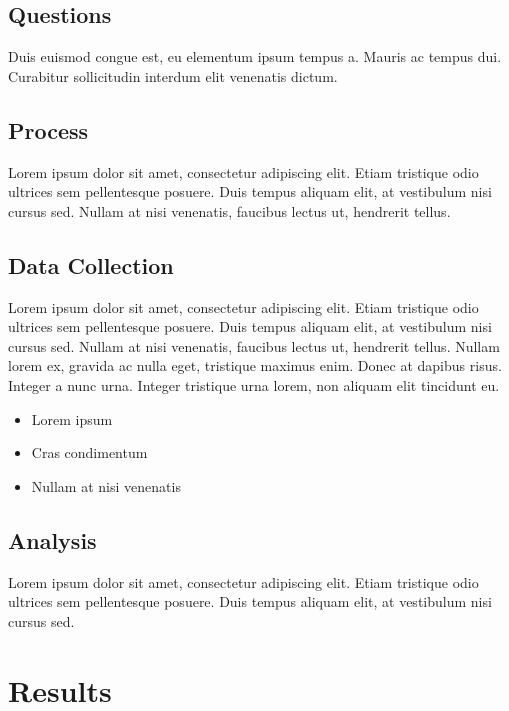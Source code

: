 \documentclass[11pt, a4paper]{resources/JTH}
\begin{document}
    \subsection{Questions}
    
        Duis euismod congue est, eu elementum ipsum tempus a. Mauris ac tempus dui. Curabitur sollicitudin interdum elit venenatis dictum. \parencite{beck2003test}

    \subsection{Process}
    
        Lorem ipsum dolor sit amet, consectetur adipiscing elit. Etiam tristique odio ultrices sem pellentesque posuere. Duis tempus aliquam elit, at vestibulum nisi cursus sed. Nullam at nisi venenatis, faucibus lectus ut, hendrerit tellus.

    \subsection{Data Collection}
    
        Lorem ipsum dolor sit amet, consectetur adipiscing elit. Etiam tristique odio ultrices sem pellentesque posuere. Duis tempus aliquam elit, at vestibulum nisi cursus sed. Nullam at nisi venenatis, faucibus lectus ut, hendrerit tellus. Nullam lorem ex, gravida ac nulla eget, tristique maximus enim. Donec at dapibus risus. Integer a nunc urna. Integer tristique urna lorem, non aliquam elit tincidunt eu.
        
        \begin{itemize}
            \item Lorem ipsum
            \item Cras condimentum
            \item Nullam at nisi venenatis
        \end{itemize}

    \subsection{Analysis}
    
        Lorem ipsum dolor sit amet, consectetur adipiscing elit. Etiam tristique odio ultrices sem pellentesque posuere. Duis tempus aliquam elit, at vestibulum nisi cursus sed.

\section{Results}
\end{document}
